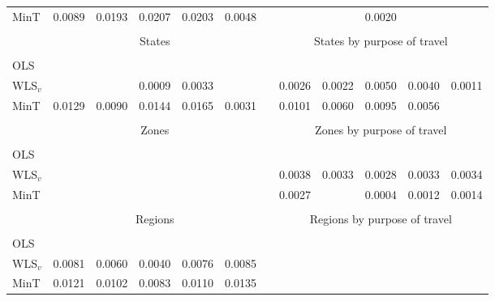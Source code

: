 \documentclass[11pt]{article}
\newcommand{\0}{\phantom{0}}
\begin{document}
\begin{table}[p]
\begin{threeparttable}
\begin{tabular}{lrrrrrrrrrrr}
			MinT & 0.0089 & 0.0193 & 0.0207 & 0.0203 & 0.0048 & & \bm{$-0.0012$} & \bm{$-0.0118$} & 0.0020 & \bm{$-0.0105$} & \bm{$-0.0127$} \\
			\cline{2-6} \cline{8-12}\\[-0.3cm]
			& \multicolumn{5}{c}{States} & & \multicolumn{5}{c}{States by purpose of travel} \\
			\cline{2-6} \cline{8-12}\\[-0.3cm]
			OLS & \bm{$-0.0333$} & \bm{$-0.0314$} & \bm{$-0.0207$} & \bm{$-0.0510$} & \bm{$-0.2106$} & & \bm{$-0.0636$} & \bm{$-0.0423$} & \bm{$-0.0455$} & \bm{$-0.0593$} & \bm{$-0.1031$} \\
			WLS$_{v}$ & \bm{$-0.0017$} & \bm{$-0.0016$} & 0.0009 & 0.0033 & \bm{$-0.0009$} & & 0.0026 & 0.0022 & 0.0050 & 0.0040 & 0.0011 \\
			MinT & 0.0129 & 0.0090 & 0.0144 & 0.0165 & 0.0031 & & 0.0101 & 0.0060 & 0.0095 & 0.0056 & \bm{$-0.0001$} \\
			\cline{2-6} \cline{8-12}\\[-0.3cm]
			& \multicolumn{5}{c}{Zones} & & \multicolumn{5}{c}{Zones by purpose of travel} \\
			\cline{2-6} \cline{8-12}\\[-0.3cm]
			OLS & \bm{$-0.0274$} & \bm{$-0.0213$} & \bm{$-0.0226$} & \bm{$-0.0350$} & \bm{$-0.1622$} & & \bm{$-0.0752$} & \bm{$-0.0632$} & \bm{$-0.0703$} & \bm{$-0.0543$} & \bm{$-0.0962$} \\
			WLS$_{v}$ & \bm{$-0.0084$} & \bm{$-0.0095$} & \bm{$-0.0120$} & \bm{$-0.0133$} & \bm{$-0.0099$} & & 0.0038 & 0.0033 & 0.0028 & 0.0033 & 0.0034 \\
			MinT & \bm{$-0.0008$} & \bm{$-0.0036$} & \bm{$-0.0057$} & \bm{$-0.0071$} & \bm{$-0.0093$} & & 0.0027 & \bm{$-0.0018$} & 0.0004 & 0.0012 & 0.0014 \\
			\cline{2-6} \cline{8-12} \\[-0.3cm]
			& \multicolumn{5}{c}{Regions} & & \multicolumn{5}{c}{Regions by purpose of travel} \\
			\cline{2-6} \cline{8-12}\\[-0.3cm]
			OLS & \bm{$-0.0262$} & \bm{$-0.0239$} & \bm{$-0.0297$} & \bm{$-0.0288$} & \bm{$-0.1026$} & & \bm{$-0.1249$} & \bm{$-0.0940$} & \bm{$-0.0897$} & \bm{$-0.0912$} & \bm{$-0.1295$} \\
			WLS$_{v}$ & 0.0081 & 0.0060 & 0.0040 & 0.0076 & 0.0085 & & \bm{$-0.0148$} & \bm{$-0.0131$} & \bm{$-0.0112$} & \bm{$-0.0119$} & \bm{$-0.0140$} \\
			MinT & 0.0121 & 0.0102 & 0.0083 & 0.0110 & 0.0135 & & \bm{$-0.0149$} & \bm{$-0.0148$} & \bm{$-0.0131$} & \bm{$-0.0138$} & \bm{$-0.0152$} \\

\end{tabular}
\end{threeparttable}
\end{table}
\end{document}
